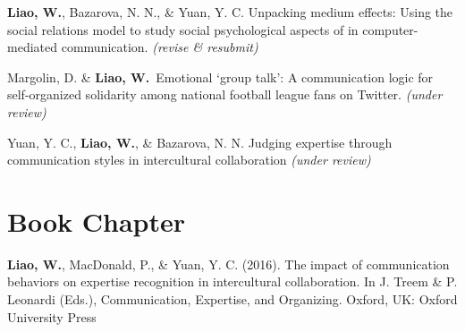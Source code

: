 \documentclass[11pt, letterpaper]{article} %
\newcommand{\years}[1]{\leavevmode\marginnote{\scriptsize #1}} %
\begin{document}
\begin{hangparas}{.25in}{1}

    \textbf{Liao, W.}, Bazarova, N. N., \& Yuan, Y. C. Unpacking medium effects: Using the social relations model to study social psychological aspects of in computer-mediated communication. \textsl{(revise \& resubmit)}

    Margolin, D. \& \textbf{Liao, W.}~Emotional ‘group talk’: A communication logic for self-organized solidarity among national football league fans on Twitter. \textsl{(under review)}

    Yuan, Y. C., \textbf{Liao, W.}, \& Bazarova, N. N. Judging expertise through communication styles in intercultural collaboration \textsl{(under review)}

    \vspace{\parskip}

\end{hangparas}
\vspace{+\parskip}

\section*{Book Chapter}
\begin{hangparas}{.25in}{1}

    \textbf{Liao, W.}, \years{2016}  MacDonald, P., \& Yuan, Y. C. (2016). The impact of communication behaviors on expertise recognition in intercultural collaboration. In J. Treem \& P. Leonardi (Eds.), Communication, Expertise, and Organizing. Oxford, UK: Oxford University Press

    \vspace{\parskip}

\end{hangparas}

\end{document}
